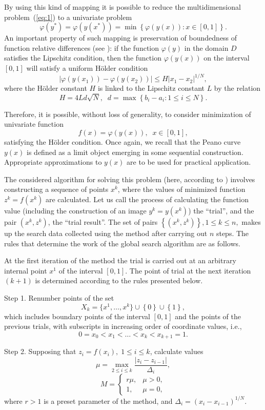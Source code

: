 \documentclass[smallcondensed]{svjour3}     %
\begin{document}
By using this kind of mapping it is possible to reduce the multidimensional problem~(\ref{eq:1}) to a univariate problem
\[
\varphi(y^\ast)=\varphi(y(x^\ast))=\min{\left\{\varphi(y(x)): x\in[0,1]\right\}}.
\]
An important property of such mapping is preservation of boundedness of function relative differences  (see \cite{RefStrongin2000}): if the function $\varphi(y)$ in the domain $D$ satisfies the Lipschitz condition, then the function $\varphi(y(x))$ on the interval $[0,1]$ will satisfy a uniform H{\"o}lder condition
\[
\left|\varphi(y(x_1))-\varphi(y(x_2))\right|\leq H\left|x_1-x_2\right|^{1/N},
\]
where the H{\"o}lder constant $H$ is linked to the Lipschitz constant $L$ by the relation
\[
H=4Ld\sqrt{N},\;\; d=\max{\left\{b_i-a_i:1\leq i \leq N\right\}}.
\]

Therefore, it is possible, without loss of generality, to consider minimization of univariate function
\[
f(x)=\varphi(y(x)), \;\; x\in[0,1],
\]
satisfying the H{\"o}lder condition.
Once again, we recall that the Peano curve $y(x)$ is defined as a limit object emerging in some sequential construction. Appropriate approximations to $y(x)$ are to be used for practical application.

The considered algorithm for solving this problem (here, according to \cite{RefStrongin2000}) involves constructing a sequence of points $x^k$, where the values of minimized function $z^k = f(x^k)$ are calculated. Let us call the process of calculating the function value (including the construction of an image $y^k=y(x^k)$) the ``trial'', and the pair $(x^k, z^k)$, the ``trial result''. The set of pairs $\left\{(x^k, z^k)\right\}, 1\leq k\leq n,$ makes up the search data collected using the method after carrying out $n$ steps. The rules that determine the work of the global search algorithm are as follows.

At the first iteration of the method the trial is carried out at an arbitrary internal point $x^1$ of the interval $[0,1]$. The point of trial at the next iteration $(k+1)$ is determined according to the rules presented below.

Step 1. Renumber points of the set
\[
X_k=\{x^1,\dots,x^k\}\cup\left\{0\right\}\cup\left\{1\right\},
\]
which includes boundary points of the interval $[0,1]$ and the points of the previous trials, with subscripts in increasing order of coordinate values, i.e.,
\[
0=x_0<x_1<\dots <x_k<x_{k+1}=1.
\]

Step 2. Supposing that  $z_i=f(x_i), \; 1\leq i \leq k$, calculate values 
\begin{equation}\label{eq:11}
\mu = \max_{2\leq i \leq k}\frac{\left|z_i-z_{i-1}\right|}{\Delta_i},
\end{equation}
\[
M = \left\{
   \begin{array}{lr}
     r\mu, & \mu > 0,\\
     1, & \mu = 0,
   \end{array}
\right.
 \]
where $r>1$ is a preset parameter of the method, and $\Delta_i=\left(x_i-x_{i-1}\right)^{1/N}$.
\end{document}
